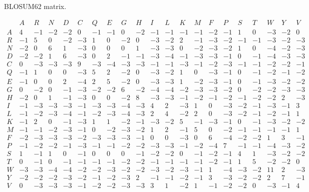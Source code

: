 \begin{table}
\caption{BLOSUM62 matrix.}
\footnotesize
\[
\begin{array}{c|rrrrrrrrrrrrrrrrrrrr}
   & A  & R  & N  & D  & C  & Q  & E  & G  & H  & I  & L  & K  & M  & F  & P  & S  & T  & W  & Y  & V \\
\hline
A  &  4 & -1 & -2 & -2 &  0 & -1 & -1 &  0 & -2 & -1 & -1 & -1 & -1 & -2 & -1 &  1 &  0 & -3 & -2 &  0 \\
R  & -1 &  5 &  0 & -2 & -3 &  1 &  0 & -2 &  0 & -3 & -2 &  2 & -1 & -3 & -2 & -1 & -1 & -3 & -2 & -3 \\
N  & -2 &  0 &  6 &  1 & -3 &  0 &  0 &  0 &  1 & -3 & -3 &  0 & -2 & -3 & -2 &  1 &  0 & -4 & -2 & -3 \\
D  & -2 & -2 &  1 &  6 & -3 &  0 &  2 & -1 & -1 & -3 & -4 & -1 & -3 & -3 & -1 &  0 & -1 & -4 & -3 & -3 \\
C  &  0 & -3 & -3 & -3 &  9 & -3 & -4 & -3 & -3 & -1 & -1 & -3 & -1 & -2 & -3 & -1 & -1 & -2 & -2 & -1 \\
Q  & -1 &  1 &  0 &  0 & -3 &  5 &  2 & -2 &  0 & -3 & -2 &  1 &  0 & -3 & -1 &  0 & -1 & -2 & -1 & -2 \\
E  & -1 &  0 &  0 &  2 & -4 &  2 &  5 & -2 &  0 & -3 & -3 &  1 & -2 & -3 & -1 &  0 & -1 & -3 & -2 & -2 \\
G  &  0 & -2 &  0 & -1 & -3 & -2 & -2 &  6 & -2 & -4 & -4 & -2 & -3 & -3 & -2 &  0 & -2 & -2 & -3 & -3 \\
H  & -2 &  0 &  1 & -1 & -3 &  0 &  0 & -2 &  8 & -3 & -3 & -1 & -2 & -1 & -2 & -1 & -2 & -2 &  2 & -3 \\
I  & -1 & -3 & -3 & -3 & -1 & -3 & -3 & -4 & -3 &  4 &  2 & -3 &  1 &  0 & -3 & -2 & -1 & -3 & -1 &  3 \\
L  & -1 & -2 & -3 & -4 & -1 & -2 & -3 & -4 & -3 &  2 &  4 & -2 &  2 &  0 & -3 & -2 & -1 & -2 & -1 &  1 \\
K  & -1 &  2 &  0 & -1 & -3 &  1 &  1 & -2 & -1 & -3 & -2 &  5 & -1 & -3 & -1 &  0 & -1 & -3 & -2 & -2 \\
M  & -1 & -1 & -2 & -3 & -1 &  0 & -2 & -3 & -2 &  1 &  2 & -1 &  5 &  0 & -2 & -1 & -1 & -1 & -1 &  1 \\
F  & -2 & -3 & -3 & -3 & -2 & -3 & -3 & -3 & -1 &  0 &  0 & -3 &  0 &  6 & -4 & -2 & -2 &  1 &  3 & -1 \\
P  & -1 & -2 & -2 & -1 & -3 & -1 & -1 & -2 & -2 & -3 & -3 & -1 & -2 & -4 &  7 & -1 & -1 & -4 & -3 & -2 \\
S  &  1 & -1 &  1 &  0 & -1 &  0 &  0 &  0 & -1 & -2 & -2 &  0 & -1 & -2 & -1 &  4 &  1 & -3 & -2 & -2 \\
T  &  0 & -1 &  0 & -1 & -1 & -1 & -1 & -2 & -2 & -1 & -1 & -1 & -1 & -2 & -1 &  1 &  5 & -2 & -2 &  0 \\
W  & -3 & -3 & -4 & -4 & -2 & -2 & -3 & -2 & -2 & -3 & -2 & -3 & -1 &  1 & -4 & -3 & -2 & 11 &  2 & -3 \\
Y  & -2 & -2 & -2 & -3 & -2 & -1 & -2 & -3 &  2 & -1 & -1 & -2 & -1 &  3 & -3 & -2 & -2 &  2 &  7 & -1 \\
V  &  0 & -3 & -3 & -3 & -1 & -2 & -2 & -3 & -3 &  3 &  1 & -2 &  1 & -1 & -2 & -2 &  0 & -3 & -1 &  4 \\
\end{array}
\]
\end{table}

